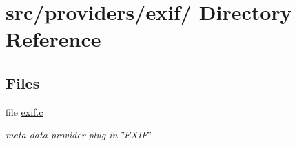 \hypertarget{dir_000021}{
\section{src/providers/exif/ Directory Reference}
\label{dir_000021}
}
\subsection*{Files}
\begin{CompactItemize}
\item 
file \hyperlink{exif_8c}{exif.c}
\begin{CompactList}\small\item\em meta-data provider plug-in \char`\"{}EXIF\char`\"{} \item\end{CompactList}

\end{CompactItemize}
